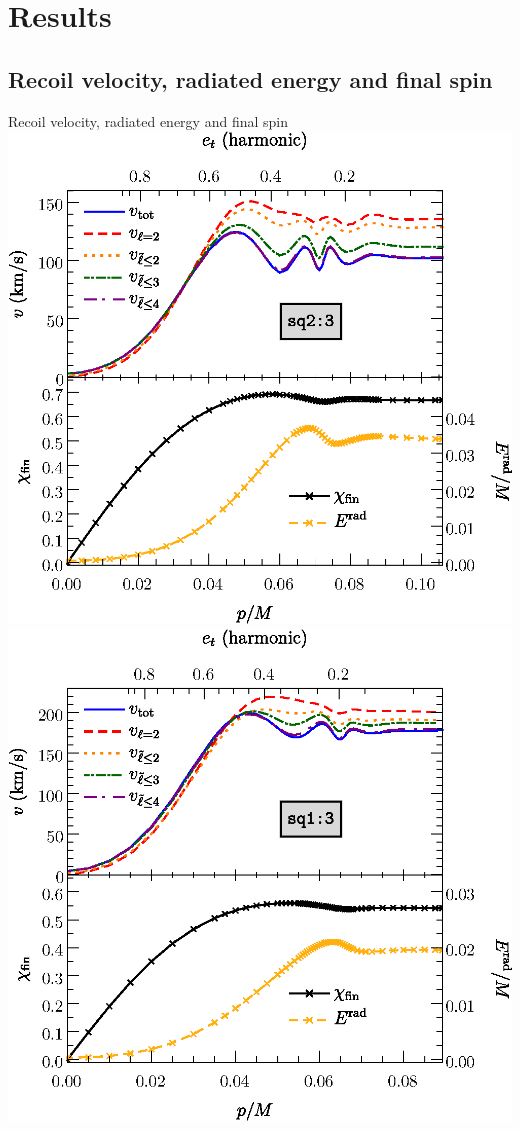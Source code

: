 \documentclass[smaller,aspectratio=169]{beamer}
\begin{document}
\section{Results}

\subsection{Recoil velocity, radiated energy and final spin}
\begin{frame}{Recoil velocity, radiated energy and final spin}
    \includegraphics[width=0.45\linewidth]{kick-q1.5-wlabel.eps}
    \hfill
    \includegraphics[width=0.45\linewidth]{kick-q3-wlabel.eps}
\end{frame}
\end{document}
